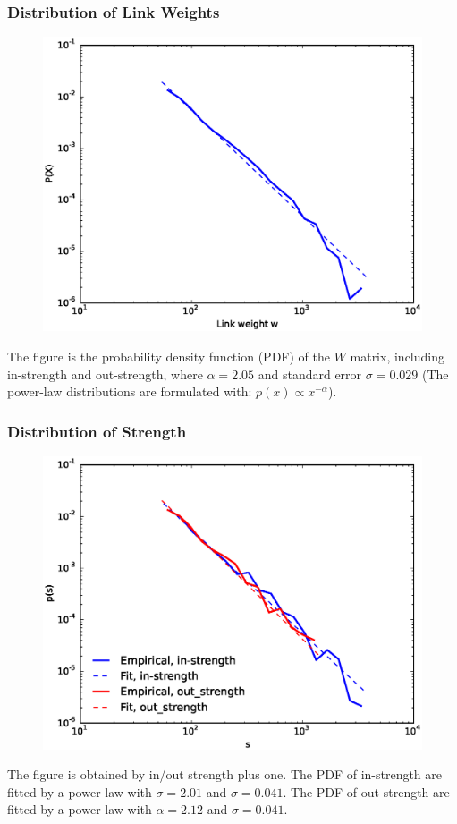 \documentclass{beamer}
\begin{document}
\begin{frame}
\frametitle{Distribution of Link Weights}
\begin{figure}
\includegraphics[width=0.65\linewidth]{wpdf.eps}
\end{figure}
\small{The figure is the probability density function (PDF) of the $W$ matrix, including in-strength and out-strength, where $\alpha=2.05$ and standard error $\sigma= 0.029$ (The power-law distributions are formulated with: $p(x)\propto x^{-\alpha}$).}
\end{frame}





\begin{frame}
\frametitle{Distribution of Strength}
\begin{figure}
\includegraphics[width=0.65\linewidth]{strengthpdf.eps}
\end{figure}
\small{The figure is obtained by in/out strength plus one. The PDF of in-strength are fitted by a power-law with $\sigma=2.01$ and $\sigma=0.041$. The PDF of out-strength are fitted by a power-law with $\alpha=2.12$ and $\sigma=0.041$.
}
\end{frame}
\end{document}
